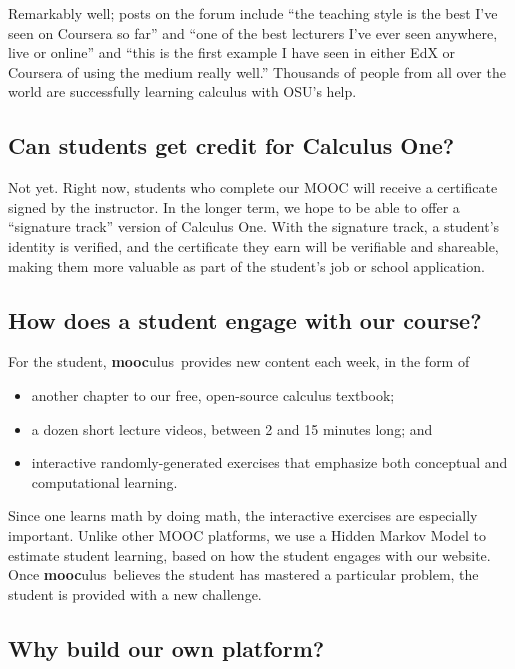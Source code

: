 \documentclass[12pt]{amsart}
\newcommand{\mooculus}{\textsf{\textbf{mooc}ulus}}
\begin{document}
Remarkably well; posts on the forum include ``the teaching style is
the best I've seen on Coursera so far'' and ``one of the best
lecturers I've ever seen anywhere, live or online'' and ``this is the
first example I have seen in either EdX or Coursera of using the
medium really well.''  Thousands of people from all over the world are
successfully learning calculus with OSU's help.

\subsection*{Can students get credit for Calculus One?}

Not yet.  Right now, students who complete our MOOC will receive a
certificate signed by the instructor.  In the longer term, we hope to
be able to offer a ``signature track'' version of Calculus One.  With
the signature track, a student's identity is verified, and the
certificate they earn will be verifiable and shareable, making them
more valuable as part of the student's job or school application.

\pagebreak

\subsection*{How does a student engage with our course?}

For the student, \mooculus\ provides new content each week, in the form of
\begin{itemize}
\item another chapter to our free, open-source calculus textbook;
\item a dozen short lecture videos, between 2 and 15 minutes long; and
\item interactive randomly-generated exercises that emphasize both conceptual and computational learning.
\end{itemize}
Since one learns math by doing math, the interactive exercises are
especially important.  Unlike other MOOC platforms, we use
a Hidden Markov Model to estimate student learning, based on how the
student engages with our website.  Once \mooculus\ believes the
student has mastered a particular problem, the
student is provided with a new challenge.

\subsection*{Why build our own platform?}
\end{document}
